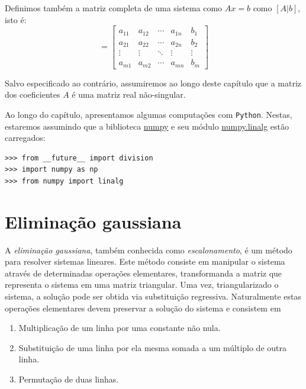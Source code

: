 Definimos também a matriz completa de uma sistema como $Ax=b$ como $[A|b]$, isto é:
\begin{equation*}
 [A|b]=\left[\begin{array}{cccc|c}
a_{11} & a_{12} & \cdots & a_{1n}&b_1\\
a_{21} & a_{22} & \cdots & a_{2n}&b_2\\
\vdots & \vdots & \ddots & \vdots&\vdots\\
a_{m1} & a_{m2} & \cdots & a_{mn}&b_m
\end{array}\right]
\end{equation*}


Salvo especificado ao contrário, assumiremos ao longo deste capítulo que a matriz dos coeficientes $A$ é uma matriz real não-singular.

\ifispython
Ao longo do capítulo, apresentamos algumas computações com \verb+Python+. Nestas, estaremos assumindo que a biblioteca \href{http://www.numpy.org/}{numpy} e seu módulo \href{https://docs.scipy.org/doc/numpy/reference/routines.linalg.html}{numpy.linalg} estão carregados:
\begin{verbatim}
>>> from __future__ import division
>>> import numpy as np
>>> from numpy import linalg
\end{verbatim}
\fi






\section{Eliminação gaussiana}
A \emph{eliminação gaussiana}, também conhecida como \emph{escalonamento}, é um método para resolver sistemas lineares. Este método consiste em manipular o sistema através de determinadas operações elementares, transformanda a matriz que representa o sistema em uma matriz triangular. Uma vez, triangularizado o sistema, a solução pode ser obtida via substituição regressiva. Naturalmente estas operações elementares devem preservar a solução do sistema e consistem em
\begin{enumerate}
\item Multiplicação de um linha por uma constante não nula.
\item Substituição de uma linha por ela mesma somada a um múltiplo de outra linha.
\item Permutação de duas linhas.
\end{enumerate}

